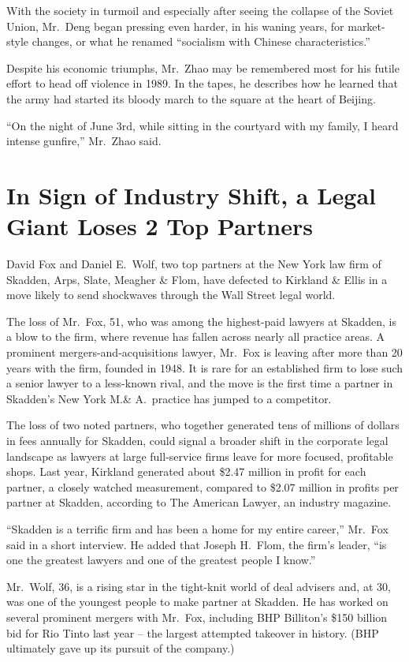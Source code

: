 \documentclass[12pt,a4paper,onecolumn]{article}
\begin{document}
With the society in turmoil and especially after seeing the collapse of the Soviet Union, Mr.~Deng
began pressing even harder, in his waning years, for market-style changes, or what he renamed
``socialism with Chinese characteristics.''

Despite his economic triumphs, Mr.~Zhao may be remembered most for his futile effort to head off
violence in 1989. In the tapes, he describes how he learned that the army had started its bloody
march to the square at the heart of Beijing.

``On the night of June 3rd, while sitting in the courtyard with my family, I heard intense
gunfire,'' Mr.~Zhao said.

\section{In Sign of Industry Shift, a Legal Giant Loses 2 Top Partners}

David Fox and Daniel E.~Wolf, two top partners at the New York law firm of Skadden, Arps, Slate,
Meagher \& Flom, have defected to Kirkland \& Ellis in a move likely to send shockwaves through the
Wall Street legal world.

The loss of Mr.~Fox, 51, who was among the highest-paid lawyers at Skadden, is a blow to the firm,
where revenue has fallen across nearly all practice areas. A prominent mergers-and-acquisitions
lawyer, Mr.~Fox is leaving after more than 20 years with the firm, founded in 1948. It is rare for
an established firm to lose such a senior lawyer to a less-known rival, and the move is the first
time a partner in Skadden's New York M.\& A.~practice has jumped to a competitor.

The loss of two noted partners, who together generated tens of millions of dollars in fees annually
for Skadden, could signal a broader shift in the corporate legal landscape as lawyers at large
full-service firms leave for more focused, profitable shops. Last year, Kirkland generated about
\$2.47 million in profit for each partner, a closely watched measurement, compared to \$2.07 million
in profits per partner at Skadden, according to The American Lawyer, an industry magazine.

``Skadden is a terrific firm and has been a home for my entire career,'' Mr.~Fox said in a short
interview. He added that Joseph H.~Flom, the firm's leader, ``is one the greatest lawyers and one of
the greatest people I know.''

Mr.~Wolf, 36, is a rising star in the tight-knit world of deal advisers and, at 30, was one of the
youngest people to make partner at Skadden. He has worked on several prominent mergers with Mr.~Fox,
including BHP Billiton's \$150 billion bid for Rio Tinto last year -- the largest attempted takeover
in history. (BHP ultimately gave up its pursuit of the company.)
\end{document}
